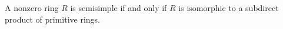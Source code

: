 A nonzero ring $R$ is semisimple if and only if $R$ is isomorphic to a subdirect product of primitive rings.
